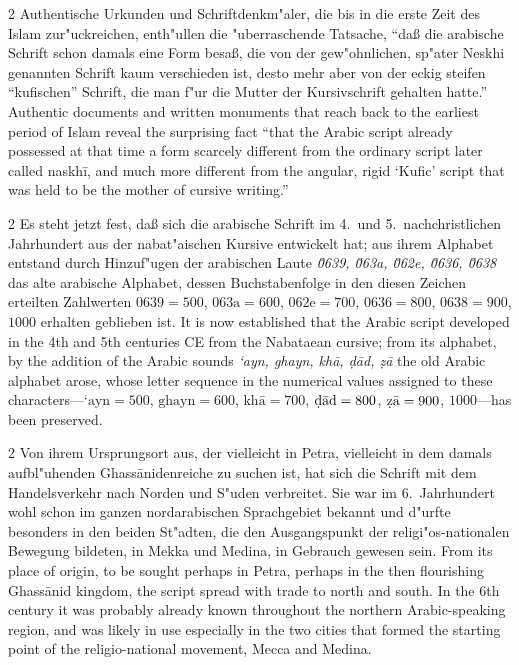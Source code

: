 \documentclass[10pt,a4paper]{article}
\renewcommand{\switchcolumn}{\syncronize\nointerlineskip\columnbreak}
\newcommand{\enquote}[1]{``#1''}
\begin{document}
\begin{paracol}{2}
Authentische Urkunden und Schriftdenkm"aler, die bis in die erste Zeit des Islam zur"uckreichen, enth"ullen die "uberraschende Tatsache, \enquote{da\ss{} die arabische Schrift schon damals eine Form besa\ss{}, die von der gew"ohnlichen, sp"ater Neskhi genannten Schrift kaum verschieden ist, desto mehr aber von der eckig steifen \enquote{kufischen} Schrift, die man f"ur die Mutter der Kursivschrift gehalten hatte.}
\switchcolumn
Authentic documents and written monuments that reach back to the earliest period of Islam reveal the surprising fact ``that the Arabic script already possessed at that time a form scarcely different from the ordinary script later called naskh\={i}, and much more different from the angular, rigid `Kufic' script that was held to be the mother of cursive writing.''
\end{paracol}

\begin{paracol}{2}
Es steht jetzt fest, da\ss{} sich die arabische Schrift im 4.\ und 5.\ nachchristlichen Jahrhundert aus der nabat"aischen Kursive entwickelt hat; aus ihrem Alphabet entstand durch Hinzuf"ugen der arabischen Laute \textit{\u0639, \u063a, \u062e, \u0636, \u0638} das alte arabische Alphabet, dessen Buchstabenfolge in den diesen Zeichen erteilten Zahlwerten $\text{\u0639}=500$, $\text{\u063a}=600$, $\text{\u062e}=700$, $\text{\u0636}=800$, $\text{\u0638}=900$, $1000$ erhalten geblieben ist.
\switchcolumn
It is now established that the Arabic script developed in the 4th and 5th centuries CE from the Nabataean cursive; from its alphabet, by the addition of the Arabic sounds \textit{`ayn, ghayn, kh\=a, \d{d}\=ad, \d{z}\=a} the old Arabic alphabet arose, whose letter sequence in the numerical values assigned to these characters---$\text{`ayn}=500$, $\text{ghayn}=600$, $\text{kh\=a}=700$, $\text{\d{d}\=ad}=800$, $\text{\d{z}\=a}=900$, $1000$---has been preserved.
\end{paracol}

\begin{paracol}{2}
Von ihrem Ursprungsort aus, der vielleicht in Petra, vielleicht in dem damals aufbl"uhenden Ghass\=anidenreiche zu suchen ist, hat sich die Schrift mit dem Handelsverkehr nach Norden und S"uden verbreitet. Sie war im 6.\ Jahrhundert wohl schon im ganzen nordarabischen Sprachgebiet bekannt und d"urfte besonders in den beiden St"adten, die den Ausgangspunkt der religi"os-nationalen Bewegung bildeten, in Mekka und Medina, in Gebrauch gewesen sein.
\switchcolumn
From its place of origin, to be sought perhaps in Petra, perhaps in the then flourishing Ghass\=anid kingdom, the script spread with trade to north and south. In the 6th century it was probably already known throughout the northern Arabic-speaking region, and was likely in use especially in the two cities that formed the starting point of the religio-national movement, Mecca and Medina.
\end{paracol}
\end{document}
